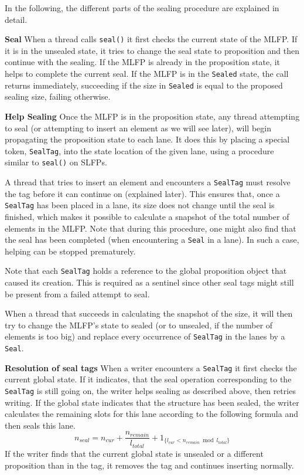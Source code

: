 \documentclass[runningheads,a4paper,fleqn]{llncs}
\begin{document}
In the following, the different parts of the sealing procedure are
explained in detail.

\textbf{Seal} When a thread calls \verb+seal()+ it first checks the
current state of the MLFP. If it is in the unsealed state, it tries to
change the seal state to proposition and then continue with the
sealing. If the MLFP is already in the proposition state, it helps
to complete the current seal. If the MLFP is in the \verb+Sealed+ state, the
call returns immediately, succeeding if the size in \verb+Sealed+ is
equal to the proposed sealing size, failing otherwise.

\textbf{Help Sealing} Once the MLFP is in the proposition state, any
thread attempting to seal (or attempting to insert an element as we will see
later), will begin propagating the proposition state to each lane. It
does this by placing a special token, \verb+SealTag+, into the state
location of the given lane, using a procedure similar to \verb+seal()+
on SLFPs.

A thread that tries to insert an element and encounters a
\verb+SealTag+ must resolve the tag before it can continue on
(explained later). This ensures that, once a \verb+SealTag+ has been
placed in a lane, its size does not change until the seal is
finished, which makes it possible to calculate a snapshot of the total number of
elements in the MLFP. Note that during this procedure, one might also
find that the seal has been completed (when encountering a \verb+Seal+
in a lane). In such a case, helping can be stopped prematurely.

Note that each \verb+SealTag+ holds a reference to the global
proposition object that caused its creation. This is required as a
sentinel since other seal tags might still be present from a failed
attempt to seal.

When a thread that succeeds in calculating the snapshot of the size,
it will then try to change the MLFP's state to sealed (or to unsealed,
if the number of elements is too big) and replace every occurrence of
\verb+SealTag+ in the lanes by a \verb+Seal+.

\textbf{Resolution of seal tags} When a writer encounters a
\verb+SealTag+ it first checks the current global state. If it
indicates, that the seal operation corresponding to the \verb+SealTag+
is still going on, the writer helps sealing as described above, then
retries writing. If the global state indicates that the structure has
been sealed, the writer calculates the remaining slots for this lane
according to the following formula and then seals this lane.
\[ n_{seal} = n_{cur} + \frac{n_{remain}}{l_{total}} +
   1_{\{ l_{cur} < n_{remain} \bmod l_{total} \}} \]
If the writer finds that the current global state is unsealed or a
different proposition than in the tag, it removes the tag and
continues inserting normally.
\end{document}
